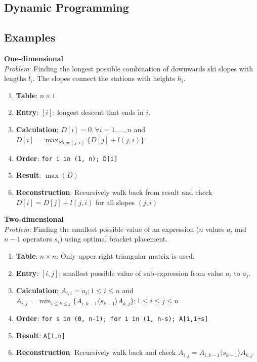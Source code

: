 \documentclass[9pt,landscape,a4paper, table]{extarticle}
\begin{document}
\begin{multicols*}{3}
\section{Dynamic Programming}

\subsection{Examples}

\textbf{One-dimensional}\\
\textit{Problem}: Finding the longest possible combination of downwards ski slopes with lengths $l_i$. The slopes connect the stations with heights $h_i$.  
\begin{enumerate}
    \item \textbf{Table}: $n\times 1$ 
    \item \textbf{Entry}: $[i]$: longest descent that ends in $i$.
    \item \textbf{Calculation}: $D[i] = 0, \forall i = 1, ... ,n$ and $\displaystyle D[i] = \max_{Slope(j,i)}\{D[j] + l(j,i)\}$
    \item \textbf{Order}: \texttt{for i in (1, n); D[i]}
    \item \textbf{Result}: $\max(D)$
    \item \textbf{Reconstruction}: Recursively walk back from result and check $\displaystyle D[i] = D[j] + l(j,i)$ for all slopes $(j,i)$
\end{enumerate}

\textbf{Two-dimensional}\\
\textit{Problem}: Finding the smallest possible value of an expression ($n$ values $a_i$ and $n-1$ operators $s_i$) using optimal bracket placement. 
\begin{enumerate}
    \item \textbf{Table}: $n\times n$: Only upper right triangular matrix is used. 
    \item \textbf{Entry}: $[i,j]$: smallest possible value of sub-expression from value $a_i$ to $a_j$.
    \item \textbf{Calculation}: $A_{i,i} = a_i; 1\leq i \leq n$ and $\displaystyle A_{i,j} = \min_{i\leq k \leq j}\{A_{i,k-1}\langle s_{k-1}\rangle A_{k,j}\}; 1\leq i\leq j\leq n$
    \item \textbf{Order}: \texttt{for s in (0, n-1); for i in (1, n-s); A[i,i+s]}
    \item \textbf{Result}: \texttt{A[1,n]}
    \item \textbf{Reconstruction}: Recursively walk back and check $\displaystyle A_{i,j} = A_{i,k-1}\langle s_{k-1}\rangle A_{k,j}$
\end{enumerate}


\end{multicols*}
\end{document}
